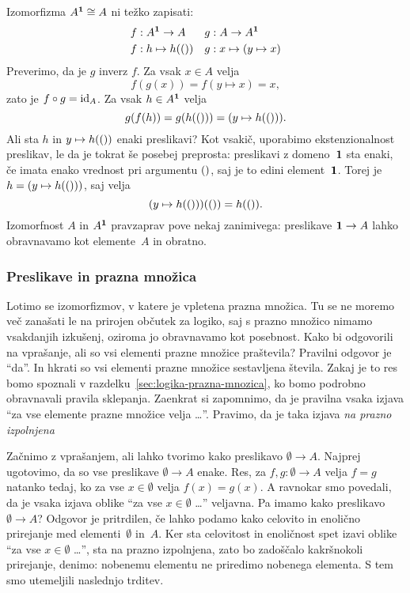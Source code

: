 Izomorfizma $A^\one \ism A$ ni težko zapisati:
%
\begin{align*}
  f &: A^\one \to A &
  g &: A \to A^\one \\
  f &: h \mapsto h(\unit) &
  g &: x \mapsto (y \mapsto x)
\end{align*}
%
Preverimo, da je $g$ inverz $f$. Za vsak $x \in A$ velja
%
\begin{equation*}
  f(g(x)) = f(y \mapsto x) = x,
\end{equation*}
%
zato je $f \circ g = \id[A]$. Za vsak $h \in A^\one$ velja
%
\begin{equation*}
  g(f(h)) = g(h(\unit)) = (y \mapsto h(\unit)).
\end{equation*}
%
Ali sta $h$ in $y \mapsto h(\unit)$ enaki preslikavi? Kot vsakič, uporabimo
ekstenzionalnost preslikav, le da je tokrat še posebej preprosta: preslikavi z
domeno~$\one$ sta enaki, če imata enako vrednost pri argumentu $\unit$, saj je to edini
element~$\one$. Torej je $h = (y \mapsto h(\unit))$, saj velja
%
\begin{equation*}
  (y \mapsto h(\unit))(\unit) = h(\unit).
\end{equation*}
%
Izomorfnost $A$ in $A^\one$ pravzaprav pove nekaj zanimivega: preslikave $\one \to A$
lahko obravnavamo kot elemente~$A$ in obratno.


\subsubsection{Preslikave in prazna množica}
\label{sec:presl-prazna-mnozica}

Lotimo se izomorfizmov, v katere je vpletena prazna množica. Tu se ne moremo več zanašati
le na prirojen občutek za logiko, saj s prazno množico nimamo vsakdanjih izkušenj, oziroma
jo obravnavamo kot posebnost. Kako bi odgovorili na vprašanje, ali so vsi elementi prazne
množice praštevila? Pravilni odgovor je ``da''. In hkrati so vsi elementi prazne množice
sestavljena števila. Zakaj je to res bomo spoznali v
razdelku~\ref{sec:logika-prazna-mnozica}, ko bomo podrobno obravnavali pravila sklepanja.
Zaenkrat si zapomnimo, da je pravilna vsaka izjava ``za vse elemente prazne množice velja
\dots''. Pravimo, da je taka izjava \emph{na prazno izpolnjena}

Začnimo z vprašanjem, ali lahko tvorimo kako preslikavo $\emptyset \to A$. Najprej
ugotovimo, da so vse preslikave $\emptyset \to A$ enake. Res, za $f, g : \emptyset \to A$
velja $f = g$ natanko tedaj, ko za vse $x \in \emptyset$ velja $f(x) = g(x)$. A ravnokar
smo povedali, da je vsaka izjava oblike ``za vse $x \in \emptyset$ \dots'' veljavna. Pa
imamo kako preslikavo $\emptyset \to A$? Odgovor je pritrdilen, če lahko podamo kako
celovito in enolično prirejanje med elementi~$\emptyset$ in~$A$. Ker sta celovitost in
enoličnost spet izavi oblike ``za vse $x \in \emptyset$ \dots'', sta na prazno izpolnjena,
zato bo zadoščalo kakršnokoli prirejanje, denimo: nobenemu elementu ne priredimo nobenega
elementa. S tem smo utemeljili naslednjo trditev.

